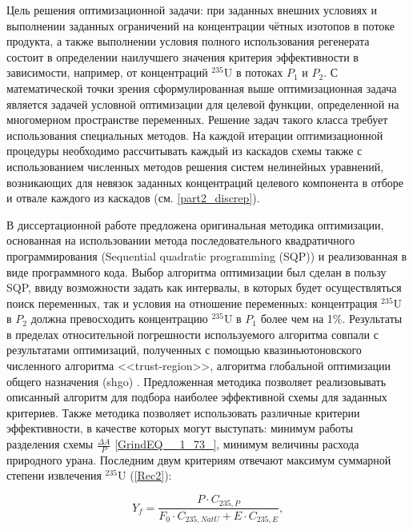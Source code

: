 Цель решения оптимизационной задачи: при заданных внешних условиях и выполнении заданных ограничений на концентрации чётных изотопов в потоке продукта, а также выполнении условия полного использования регенерата состоит в определении наилучшего значения критерия эффективности в зависимости, например, от концентраций $^{235}$U в потоках $P_{1}$ и $P_{2}$.
С математической точки зрения сформулированная выше оптимизационная задача является задачей условной оптимизации для целевой функции, определенной на многомерном пространстве переменных. Решение задач такого класса требует использования специальных методов. На каждой итерации оптимизационной процедуры необходимо рассчитывать каждый из каскадов схемы также с использованием численных методов решения систем нелинейных уравнений, возникающих для невязок заданных концентраций целевого компонента в отборе и отвале каждого из каскадов (см. \ref{part2_discrep}). 
 
В диссертационной работе предложена оригинальная методика оптимизации, основанная на использовании метода последовательного квадратичного программирования (Sequential quadratic programming (SQP)) и реализованная в виде программного кода. Выбор алгоритма оптимизации был сделан в пользу SQP, ввиду возможности задать как интервалы, в которых будет осуществляться поиск переменных, так и условия на отношение переменных: концентрация $^{235}$U в $P_2$ должна превосходить концентрацию $^{235}$U в $P_1$ более чем на 1\%. Результаты в пределах относительной погрешности используемого алгоритма совпали с результатами оптимизаций, полученных с помощью квазиньютоновского численного алгоритма <<trust-region>>, алгоритма глобальной оптимизации общего назначения (shgo)  \cite{virtanenSciPyFundamentalAlgorithms2020a}.
Предложенная методика позволяет реализовывать описанный алгоритм для подбора наиболее эффективной схемы для заданных критериев. Также методика позволяет использовать различные критерии эффективности, в качестве которых могут выступать: минимум работы разделения схемы $\frac{\Delta A}{P}$ \ref{GrindEQ__1_73_}, минимум величины расхода природного урана. Последним двум критериям отвечают максимум суммарной степени извлечения $^{235}$U (\ref{Rec2}):

\begin{equation} \label{Rec2} 
    Y_f = \frac{P \cdot C_{235,P}}{F_0 \cdot C_{235,NatU} + E \cdot C_{235,E}}, 
\end{equation} 

